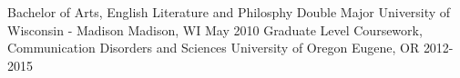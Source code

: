 
\begin{cventries}
      \cventry
    {Bachelor of Arts, English Literature and Philosphy Double Major} %
    {University of Wisconsin - Madison} %
    {Madison, WI} %
    {May 2010} %
    {
    }
    \cventry
    {Graduate Level Coursework, Communication Disorders and Sciences}
    {University of Oregon}
    {Eugene, OR}
    {2012-2015}
    {}
\end{cventries}
